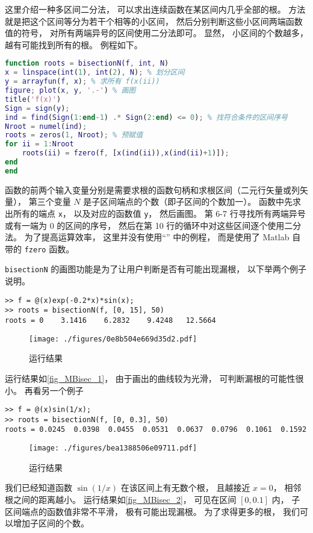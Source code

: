 

这里介绍一种多区间二分法， 可以求出连续函数在某区间内几乎全部的根。 方法就是把这个区间等分为若干个相等的小区间， 然后分别判断这些小区间两端函数值的符号， 对所有两端异号的区间使用二分法即可。 显然， 小区间的个数越多， 越有可能找到所有的根。 例程如下。

\begin{lstlisting}[language=matlab, caption=bisectionN.m]
function roots = bisectionN(f, int, N)
x = linspace(int(1), int(2), N); % 划分区间
y = arrayfun(f, x); % 求所有 f(x(ii))
figure; plot(x, y, '.-') % 画图
title('f(x)')
Sign = sign(y);
ind = find(Sign(1:end-1) .* Sign(2:end) <= 0); % 找符合条件的区间序号
Nroot = numel(ind);
roots = zeros(1, Nroot); % 预赋值
for ii = 1:Nroot
    roots(ii) = fzero(f, [x(ind(ii)),x(ind(ii)+1)]);  
end
end
\end{lstlisting}

函数的前两个输入变量分别是需要求根的函数句柄和求根区间（二元行矢量或列矢量）， 第三个变量 $N$ 是子区间端点的个数（即子区间的个数加一）。 函数中先求出所有的端点 \verb`x`， 以及对应的函数值 \verb`y`， 然后画图。 第 6-7 行寻找所有两端异号或有一端为 0 的区间的序号， 然后在第 10 行的循环中对这些区间逐个使用二分法。 为了提高运算效率， 这里并没有使用“” 中的例程， 而是使用了 Matlab 自带的 \verb`fzero` 函数。

\verb`bisectionN` 的画图功能是为了让用户判断是否有可能出现漏根， 以下举两个例子说明。
\begin{lstlisting}[language=matlabC]
>> f = @(x)exp(-0.2*x)*sin(x);
>> roots = bisectionN(f, [0, 15], 50)
roots = 0    3.1416    6.2832    9.4248   12.5664
\end{lstlisting}
\begin{figure}[ht]
\centering
\texttt{[image: ./figures/0e8b504e669d35d2.pdf]}
\caption{运行结果} \label{fig_MBisec_1}
\end{figure}
运行结果如\autoref{fig_MBisec_1}， 由于画出的曲线较为光滑， 可判断漏根的可能性很小。 再看另一个例子
\begin{lstlisting}[language=matlabC]
>> f = @(x)sin(1/x);
>> roots = bisectionN(f, [0, 0.3], 50)
roots = 0.0245  0.0398  0.0455  0.0531  0.0637  0.0796  0.1061  0.1592
\end{lstlisting}
\begin{figure}[ht]
\centering
\texttt{[image: ./figures/bea1388506e09711.pdf]}
\caption{运行结果} \label{fig_MBisec_2}
\end{figure}
我们已经知道函数 $\sin(1/x)$ 在该区间上有无数个根， 且越接近 $x = 0$， 相邻根之间的距离越小。 运行结果如\autoref{fig_MBisec_2}，  可见在区间 $[0, 0.1]$ 内， 子区间端点的函数值非常不平滑， 极有可能出现漏根。 为了求得更多的根， 我们可以增加子区间的个数。
